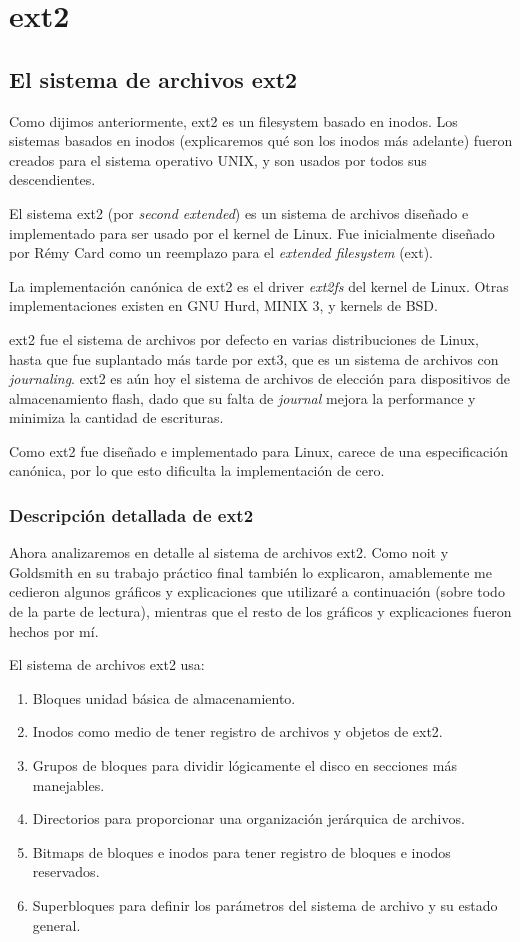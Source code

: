 \chapter{ext2}

\section{El sistema de archivos ext2}

Como dijimos anteriormente, ext2 es un filesystem basado en inodos. Los sistemas basados en inodos (explicaremos qué son los inodos más adelante) fueron creados para el sistema operativo UNIX, y son usados por todos sus descendientes.

El sistema ext2 (por \emph{second extended}) es un sistema de archivos diseñado e implementado para ser usado por el kernel de Linux. Fue inicialmente diseñado por Rémy Card como un reemplazo para el \emph{extended filesystem} (ext).

La implementación canónica de ext2 es el driver \emph{ext2fs} del kernel de Linux. Otras implementaciones existen en GNU Hurd, MINIX 3, y kernels de BSD.

ext2 fue el sistema de archivos por defecto en varias distribuciones de Linux, hasta que fue suplantado más tarde por ext3, que es un sistema de archivos con \emph{journaling}.
ext2 es aún hoy el sistema de archivos de elección para dispositivos de almacenamiento flash, dado que su falta de \emph{journal} mejora la performance y minimiza la cantidad de escrituras. 


Como ext2 fue diseñado e implementado para Linux, carece de una especificación canónica, por lo que esto dificulta la implementación de cero.

\subsection{Descripción detallada de ext2}

Ahora analizaremos en detalle al sistema de archivos ext2. Como noit y Goldsmith en su trabajo práctico final también lo explicaron, amablemente me cedieron algunos gráficos y explicaciones que utilizaré a continuación (sobre todo de la parte de lectura), mientras que el resto de los gráficos y explicaciones fueron hechos por mí.

El sistema de archivos ext2 usa:
\begin{enumerate}
  \item Bloques unidad básica de almacenamiento.
  \item Inodos como medio de tener registro de archivos y objetos de ext2.
  \item Grupos de bloques para dividir lógicamente el disco en secciones más manejables.
  \item Directorios para proporcionar una organización jerárquica de archivos.
  \item Bitmaps de bloques e inodos para tener registro de bloques e inodos reservados.
  \item Superbloques para definir los parámetros del sistema de archivo y su estado general.
\end{enumerate}

